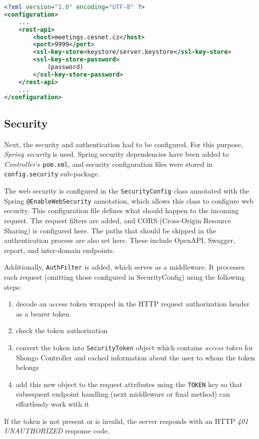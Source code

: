 \begin{lstlisting}[language=XML, caption=REST configuration example, label=conf]
<?xml version="1.0" encoding="UTF-8" ?>
<configuration>
    ...
    <rest-api>
        <host>meetings.cesnet.cz</host>
        <port>9999</port>
        <ssl-key-store>keystore/server.keystore</ssl-key-store>
        <ssl-key-store-password>
            (password)
        </ssl-key-store-password>
    </rest-api>
    ...
</configuration>
\end{lstlisting}

\subsection{Security}
Next, the security and authentication had to be configured. For this purpose, \emph{Spring security} is used. Spring security dependencies have been added to \emph{Controller}'s \texttt{pom.xml}, and security configuration files were stored in \texttt{config.security} sub-package.

The web security is configured in the \texttt{SecurityConfig} class annotated with the Spring \texttt{@EnableWebSecurity} annotation, which allows this class to configure web security\cite{springdocumentation}.
This configuration file defines what should happen to the incoming request. The request filters are added, and CORS (Cross-Origin Resource Sharing) is configured here. The paths that should be skipped in the authentication process are also set here. These include OpenAPI, Swagger, report, and inter-domain\cite{pavelka2016shongo} endpoints.

Additionally, \texttt{AuthFilter} is added, which serves as a middleware. It processes each request (omitting those configured in SecurityConfig) using the following steps:
\begin{enumerate}
    \item decode an access token wrapped in the HTTP request authorization header as a bearer token
    \item check the token authorization
    \item convert the token into \texttt{SecurityToken} object which contains \emph{access token} for Shongo Controller and cached information about the user to whom the token belongs
    \item add this new object to the request attributes using the \texttt{TOKEN} key so that subsequent endpoint handling (next middleware or final method) can effortlessly work with it
\end{enumerate}
If the token is not present or is invalid, the server responds with an HTTP \emph{401 UNAUTHORIZED} response code.

